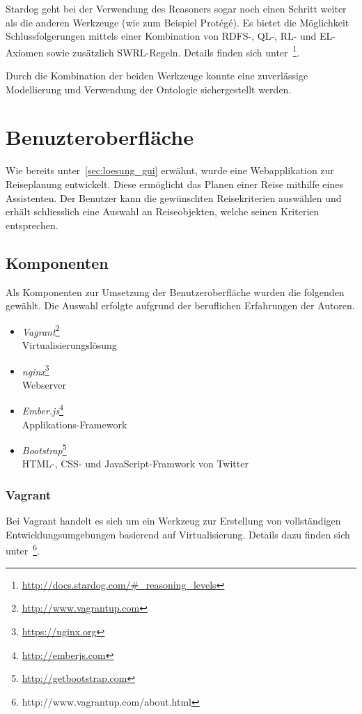 Stardog geht bei der Verwendung des Reasoners sogar noch einen Schritt weiter als die anderen Werkzeuge (wie zum Beispiel Protégé). Es bietet die Möglichkeit Schlussfolgerungen mittels einer Kombination von RDFS-, QL-, RL- und EL-Axiomen sowie zusätzlich SWRL-Regeln. Details finden sich unter~\footnote{\url{http://docs.stardog.com/\#_reasoning_levels}}.

Durch die Kombination der beiden Werkzeuge konnte eine zuverlässige Modellierung und Verwendung der Ontologie sichergestellt werden.

\section{Benuzteroberfläche}
\label{sec:komponenten:ember}
Wie bereits unter~\autoref{sec:loesung_gui} erwähnt, wurde eine Webapplikation zur Reiseplanung entwickelt. Diese ermöglicht das Planen einer Reise mithilfe eines Assistenten. Der Benutzer kann die gewünschten Reisekriterien auswählen und erhält schliesslich eine Auswahl an Reiseobjekten, welche seinen Kriterien entsprechen.

\subsection{Komponenten}
\label{subsec:komponenten:gui:komponenten}
Als Komponenten zur Umsetzung der Benutzeroberfläche wurden die folgenden gewählt. Die Auswahl erfolgte aufgrund der beruflichen Erfahrungen der Autoren.
\begin{itemize}
    \item \textit{Vagrant}\footnote{\url{http://www.vagrantup.com}}\\
        Virtualisierungslösung
    \item \textit{nginx}\footnote{\url{https://nginx.org}}\\
        Webserver
    \item \textit{Ember.js}\footnote{\url{http://emberjs.com}}\\
        Applikations-Framework
    \item \textit{Bootstrap}\footnote{\url{http://getbootstrap.com}}\\
        HTML-, CSS- und JavaScript-Framwork von Twitter
\end{itemize}

\subsubsection{Vagrant}
\label{ssubsec:komponenten:gui:komponenten:vagrant}
Bei Vagrant handelt es sich um ein Werkzeug zur Erstellung von vollständigen Entwicklungsumgebungen basierend auf Virtualisierung. Details dazu finden sich unter~\footnote{http://www.vagrantup.com/about.html}.~\cite{vagrant}

